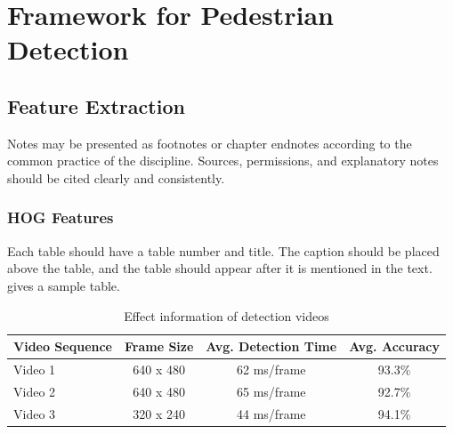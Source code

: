 \chapter{Framework for Pedestrian Detection}

\section{Feature Extraction}
Notes may be presented as footnotes or chapter endnotes according to the common practice of the discipline. Sources, permissions, and explanatory notes should be cited clearly and consistently.

\subsection{HOG Features}
Each table should have a table number and title. The caption should be placed above the table, and the table should appear after it is mentioned in the text.  gives a sample table.

\begin{table}[htbp]
  \centering
  \caption{Effect information of detection videos}
  \label{tab:video-info}
  \vspace{0.2cm}
  \begin{tabular}{lccc}
    \toprule
    Video Sequence & Frame Size & Avg. Detection Time & Avg. Accuracy \\
    \midrule
    Video 1 & 640 x 480 & 62 ms/frame & 93.3\% \\
    Video 2 & 640 x 480 & 65 ms/frame & 92.7\% \\
    Video 3 & 320 x 240 & 44 ms/frame & 94.1\% \\
    \bottomrule
  \end{tabular}
\end{table}
